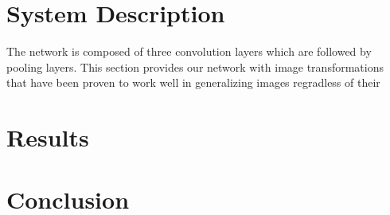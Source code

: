 \documentclass[letterpaper]{article}
\begin{document}
\section{System Description}
The network is composed of three convolution layers which are followed by pooling layers. This section provides our network with image transformations that have been proven to work well in generalizing images regradless of their 


\section{Results}


\section{Conclusion}
\end{document}
